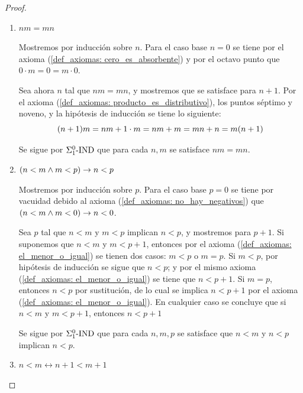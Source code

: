\begin{proof}
\begin{enumerate}
		Mostremos por inducción sobre $n$. Para el caso base $n = 0$ se tiene por el axioma (\ref{def_axiomas: cero_es_absorbente}) que $1\cdot 0 = 0$.

		Sea ahora $n$ tal que $1\cdot n = n$, y mostremos que se satisface para $n + 1$. Por el axioma (\ref{def_axiomas: producto_es_distributivo}) y la hipótesis de inducción se tiene lo siguiente:
		\[
			1\cdot\pa*{n + 1} = 1\cdot n + 1 = n + 1
		\]

		Se sigue por $\INDUCCION{\Sigma_{1}^{0}}$ que para cada $n$ se satisface $1\cdot n = n$.

		\item $nm = mn$
		
		Mostremos por inducción sobre $n$. Para el caso base $n = 0$ se tiene por el axioma (\ref{def_axiomas: cero_es_absorbente}) y por el octavo punto que $0\cdot m = 0 = m\cdot 0$.

		Sea ahora $n$ tal que $nm = mn$, y mostremos que se satisface para $n + 1$. Por el axioma (\ref{def_axiomas: producto_es_distributivo}), los puntos séptimo y noveno, y la hipótesis de inducción se tiene lo siguiente:
		\[
			\pa*{n + 1}m = nm + 1\cdot m = nm + m = mn + n = m\pa*{n + 1}
		\]

		Se sigue por $\INDUCCION{\Sigma_{1}^{0}}$ que para cada $n, m$ se satisface $nm = mn$.

		\item $\pa*{n < m\land m < p}\to n < p$
		
		Mostremos por inducción sobre $p$. Para el caso base $p = 0$ se tiene por vacuidad debido al axioma (\ref{def_axiomas: no_hay_negativos}) que $\pa*{n < m\land m < 0}\to n < 0$.

		Sea $p$ tal que $n < m$ y $m < p$ implican $n < p$, y mostremos para $p + 1$. Si suponemos que $n < m$ y $m < p + 1$, entonces por el axioma (\ref{def_axiomas: el_menor_o_igual}) se tienen dos casos: $m < p$ o $m = p$. Si $m < p$, por hipótesis de inducción se sigue que $n < p$; y por el mismo axioma (\ref{def_axiomas: el_menor_o_igual}) se tiene que $n < p + 1$. Si $m = p$, entonces $n < p$ por sustitución, de lo cual se implica $n < p + 1$ por el axioma (\ref{def_axiomas: el_menor_o_igual}). En cualquier caso se concluye que si $n < m$ y $m < p + 1$, entonces $n < p + 1$

		Se sigue por $\INDUCCION{\Sigma_{1}^{0}}$ que para cada $n, m, p$ se satisface que $n < m$ y $n < p$ implican $n < p$.

		\item $n < m\leftrightarrow n + 1 < m + 1$
		

\end{enumerate}
\end{proof}
